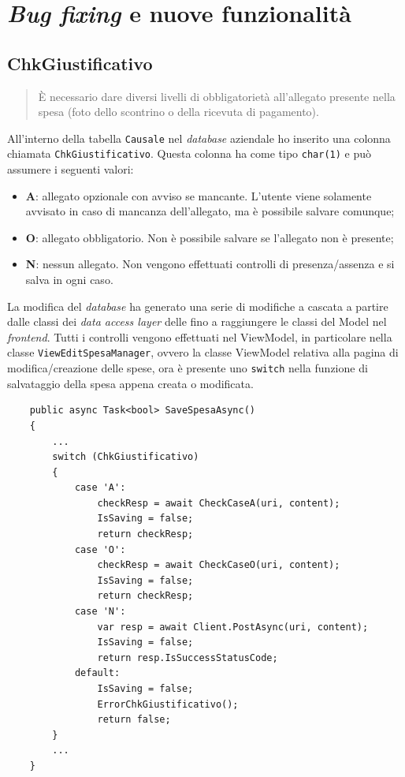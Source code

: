 \section{\textit{Bug fixing} e nuove funzionalità}

\subsection{ChkGiustificativo}

\begin{quote}
    È necessario dare diversi livelli di obbligatorietà all'allegato presente nella spesa (foto dello scontrino o della ricevuta di pagamento).
\end{quote}

\noindent All'interno della tabella \texttt{Causale} nel \textit{database} aziendale ho inserito una colonna chiamata \texttt{ChkGiustificativo}. Questa colonna ha come tipo \texttt{char(1)} e può assumere i seguenti valori:
\begin{itemize}
    \item \textbf{A}: allegato opzionale con avviso se mancante. L'utente viene solamente avvisato in caso di mancanza dell'allegato, ma è possibile salvare comunque;
    \item \textbf{O}: allegato obbligatorio. Non è possibile salvare se l'allegato non è presente;
    \item \textbf{N}: nessun allegato. Non vengono effettuati controlli di presenza/assenza e si salva in ogni caso.
\end{itemize}

\noindent La modifica del \textit{database} ha generato una serie di modifiche a cascata a partire dalle classi dei \textit{data access layer} delle  fino a raggiungere le classi del Model nel \textit{frontend}. Tutti i controlli vengono effettuati nel ViewModel, in particolare nella classe \texttt{ViewEditSpesaManager}, ovvero la classe ViewModel relativa alla pagina di modifica/creazione delle spese, ora è presente uno \texttt{switch} nella funzione di salvataggio della spesa appena creata o modificata.

\begin{verbatim}
    public async Task<bool> SaveSpesaAsync()
    {
        ...
        switch (ChkGiustificativo)
        {
            case 'A':
                checkResp = await CheckCaseA(uri, content);
                IsSaving = false;
                return checkResp;
            case 'O':
                checkResp = await CheckCaseO(uri, content);
                IsSaving = false;
                return checkResp;
            case 'N':
                var resp = await Client.PostAsync(uri, content);
                IsSaving = false;
                return resp.IsSuccessStatusCode;
            default:
                IsSaving = false;
                ErrorChkGiustificativo();
                return false;
        }
        ...
    }
\end{verbatim}


